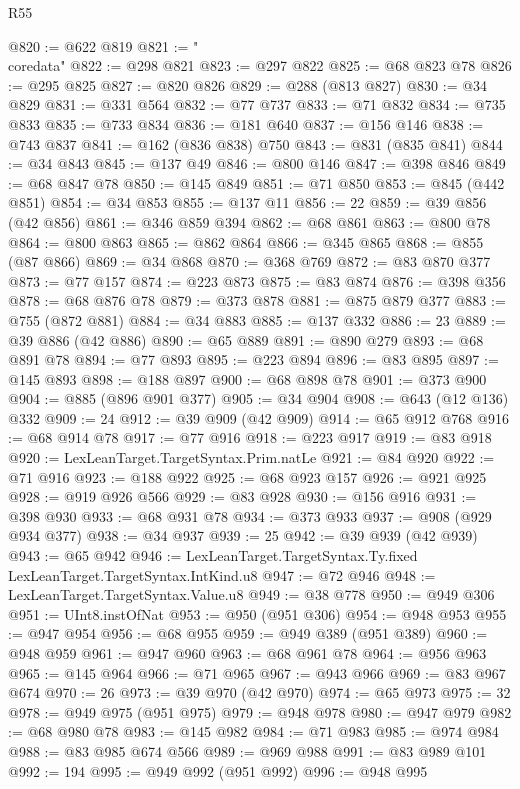 \begin{lexlean}{R55}
\begin{coremodule}
{{{{{{{{{{{{{{{{{{{{{{{{{{{{{{{{{{{{{{{{{{{{{{{{{{{{{{{{{{{{{{@820 := @622 @819
@821 := "\\coredata"
@822 := @298 @821
@823 := @297 @822
@825 := @68 @823 @78
@826 := @295 @825
@827 := @820 @826
@829 := @288 (@813 @827)
@830 := @34 @829
@831 := @331 @564
@832 := @77 @737
@833 := @71 @832
@834 := @735 @833
@835 := @733 @834
@836 := @181 @640
@837 := @156 @146
@838 := @743 @837
@841 := @162 (@836 @838) @750
@843 := @831 (@835 @841)
@844 := @34 @843
@845 := @137 @49
@846 := @800 @146
@847 := @398 @846
@849 := @68 @847 @78
@850 := @145 @849
@851 := @71 @850
@853 := @845 (@442 @851)
@854 := @34 @853
@855 := @137 @11
@856 := 22
@859 := @39 @856 (@42 @856)
@861 := @346 @859 @394
@862 := @68 @861
@863 := @800 @78
@864 := @800 @863
@865 := @862 @864
@866 := @345 @865
@868 := @855 (@87 @866)
@869 := @34 @868
@870 := @368 @769
@872 := @83 @870 @377
@873 := @77 @157
@874 := @223 @873
@875 := @83 @874
@876 := @398 @356
@878 := @68 @876 @78
@879 := @373 @878
@881 := @875 @879 @377
@883 := @755 (@872 @881)
@884 := @34 @883
@885 := @137 @332
@886 := 23
@889 := @39 @886 (@42 @886)
@890 := @65 @889
@891 := @890 @279
@893 := @68 @891 @78
@894 := @77 @893
@895 := @223 @894
@896 := @83 @895
@897 := @145 @893
@898 := @188 @897
@900 := @68 @898 @78
@901 := @373 @900
@904 := @885 (@896 @901 @377)
@905 := @34 @904
@908 := @643 (@12 @136) @332
@909 := 24
@912 := @39 @909 (@42 @909)
@914 := @65 @912 @768
@916 := @68 @914 @78
@917 := @77 @916
@918 := @223 @917
@919 := @83 @918
@920 := LexLeanTarget.TargetSyntax.Prim.natLe
@921 := @84 @920
@922 := @71 @916
@923 := @188 @922
@925 := @68 @923 @157
@926 := @921 @925
@928 := @919 @926 @566
@929 := @83 @928
@930 := @156 @916
@931 := @398 @930
@933 := @68 @931 @78
@934 := @373 @933
@937 := @908 (@929 @934 @377)
@938 := @34 @937
@939 := 25
@942 := @39 @939 (@42 @939)
@943 := @65 @942
@946 := LexLeanTarget.TargetSyntax.Ty.fixed LexLeanTarget.TargetSyntax.IntKind.u8
@947 := @72 @946
@948 := LexLeanTarget.TargetSyntax.Value.u8
@949 := @38 @778
@950 := @949 @306
@951 := UInt8.instOfNat
@953 := @950 (@951 @306)
@954 := @948 @953
@955 := @947 @954
@956 := @68 @955
@959 := @949 @389 (@951 @389)
@960 := @948 @959
@961 := @947 @960
@963 := @68 @961 @78
@964 := @956 @963
@965 := @145 @964
@966 := @71 @965
@967 := @943 @966
@969 := @83 @967 @674
@970 := 26
@973 := @39 @970 (@42 @970)
@974 := @65 @973
@975 := 32
@978 := @949 @975 (@951 @975)
@979 := @948 @978
@980 := @947 @979
@982 := @68 @980 @78
@983 := @145 @982
@984 := @71 @983
@985 := @974 @984
@988 := @83 @985 @674 @566
@989 := @969 @988
@991 := @83 @989 @101
@992 := 194
@995 := @949 @992 (@951 @992)
@996 := @948 @995
}}}}}}}}}}}}}}}}}}}}}}}}}}}}}}}}}}}}}}}}}}}}}}}}}}}}}}}}}}}}}}
\end{coremodule}
\end{lexlean}
